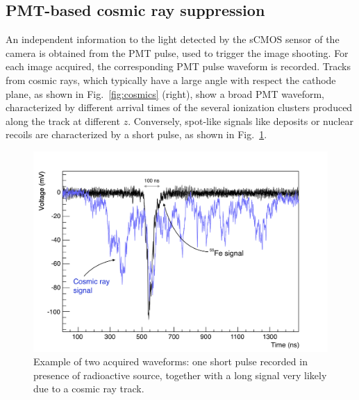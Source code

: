 \subsection{PMT-based cosmic ray suppression}
An independent information to the light detected by the sCMOS sensor
of the camera is obtained from the PMT pulse, used to trigger the
image shooting. For each image acquired, the corresponding PMT pulse
waveform is recorded.  Tracks from cosmic rays, which typically have a
large angle with respect the cathode plane, as shown in
Fig.~\ref{fig:cosmics} (right), show a broad PMT waveform,
characterized by different arrival times of the several ionization
clusters produced along the track at different $z$. Conversely,
spot-like signals like \fe deposits or nuclear recoils are
characterized by a short pulse, as shown in Fig.~\ref{fig:waveforms}.
%
\begin{figure}[ht]
  \begin{center}
    \includegraphics[width=0.69\linewidth]{figures/Waveforms.png}

    \caption{Example of two acquired waveforms: one short pulse
  recorded in presence of \fe radioactive source, together with a long
  signal very likely due to a cosmic ray
  track.  \label{fig:waveforms}}

  \end{center}
\end{figure}

